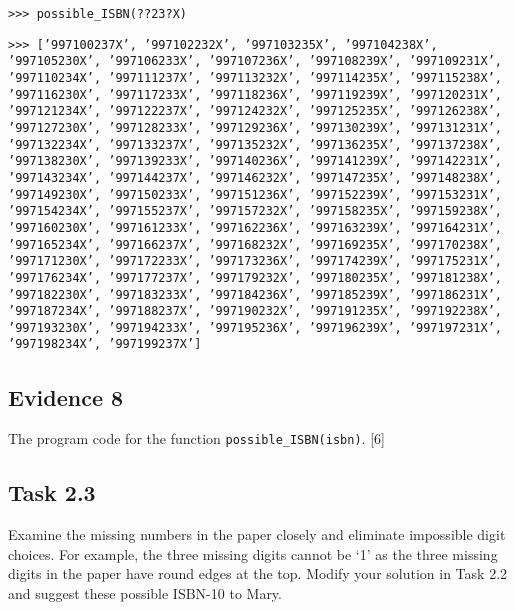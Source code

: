 \noindent %
\noindent\begin{minipage}[t]{1\columnwidth}%
\texttt{>\textcompwordmark >\textcompwordmark > possible\_ISBN(??23?X\textquotedbl ) }

\texttt{>\textcompwordmark >\textcompwordmark > {[}'997100237X',
'997102232X', '997103235X', '997104238X', '997105230X', '997106233X',
'997107236X', '997108239X', '997109231X', '997110234X', '997111237X',
'997113232X', '997114235X', '997115238X', '997116230X', '997117233X',
'997118236X', '997119239X', '997120231X', '997121234X', '997122237X',
'997124232X', '997125235X', '997126238X', '997127230X', '997128233X',
'997129236X', '997130239X', '997131231X', '997132234X', '997133237X',
'997135232X', '997136235X', '997137238X', '997138230X', '997139233X',
'997140236X', '997141239X', '997142231X', '997143234X', '997144237X',
'997146232X', '997147235X', '997148238X', '997149230X', '997150233X',
'997151236X', '997152239X', '997153231X', '997154234X', '997155237X',
'997157232X', '997158235X', '997159238X', '997160230X', '997161233X',
'997162236X', '997163239X', '997164231X', '997165234X', '997166237X',
'997168232X', '997169235X', '997170238X', '997171230X', '997172233X',
'997173236X', '997174239X', '997175231X', '997176234X', '997177237X',
'997179232X', '997180235X', '997181238X', '997182230X', '997183233X',
'997184236X', '997185239X', '997186231X', '997187234X', '997188237X',
'997190232X', '997191235X', '997192238X', '997193230X', '997194233X',
'997195236X', '997196239X', '997197231X', '997198234X', '997199237X'{]}}%
\end{minipage}

\subsection*{Evidence 8 }

The program code for the function \texttt{possible\_ISBN(isbn)}. \hfill{}{[}6{]}

\subsection*{Task 2.3}

Examine the missing numbers in the paper closely and eliminate impossible
digit choices. For example, the three missing digits cannot be \textquoteleft 1\textquoteright{}
as the three missing digits in the paper have round edges at the top.
Modify your solution in Task 2.2 and suggest these possible ISBN-10
to Mary.

